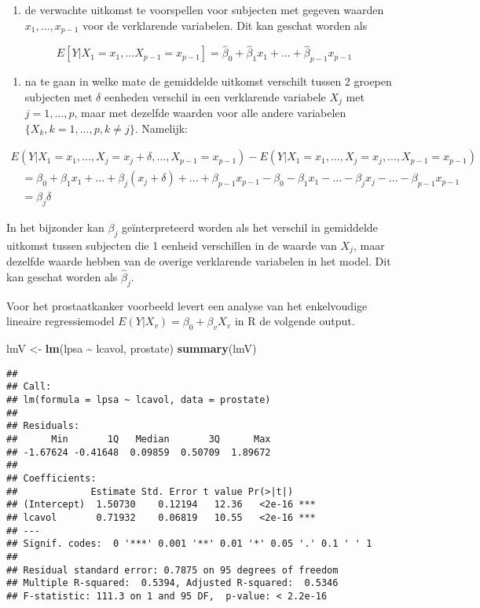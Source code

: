 \documentclass[
  12pt,dutch,coursenotes]{book}
\newenvironment{Shaded}{\begin{snugshade}}{\end{snugshade}}
\newcommand{\KeywordTok}[1]{\textcolor[rgb]{0.13,0.29,0.53}{\textbf{#1}}}
\newcommand{\NormalTok}[1]{#1}
\newcommand{\OperatorTok}[1]{\textcolor[rgb]{0.81,0.36,0.00}{\textbf{#1}}}
\newcommand{\StringTok}[1]{\textcolor[rgb]{0.31,0.60,0.02}{#1}}
\providecommand{\tightlist}{%
  \setlength{\itemsep}{0pt}\setlength{\parskip}{0pt}}
\theoremstyle{definition}
\theoremstyle{definition}
\theoremstyle{definition}
\theoremstyle{remark}
\begin{document}
\begin{enumerate}
\def\labelenumi{\arabic{enumi}.}
\tightlist
\item
  de verwachte uitkomst te voorspellen voor subjecten met gegeven
  waarden \(x_1,...,x_{p-1}\) voor de verklarende variabelen.
  Dit kan geschat worden als
\end{enumerate}

\[
E[Y\vert X_1=x_1, \ldots X_{p-1}=x_{p-1}]=\hat{\beta}_0+\hat{\beta}_1x_1+...+\hat{\beta}_{p-1}x_{p-1}
\]

\begin{enumerate}
\def\labelenumi{\arabic{enumi}.}
\setcounter{enumi}{1}
\tightlist
\item
  na te gaan in welke mate de gemiddelde uitkomst verschilt tussen 2 groepen subjecten met \(\delta\) eenheden verschil in een verklarende variabele \(X_j\) met \(j=1,\ldots,p\), maar met dezelfde waarden voor alle andere variabelen \(\{X_k,k=1,...,p,k\ne j\}\).
  Namelijk:
\end{enumerate}

\[
\begin{array}{l}
E(Y|X_1=x_1,...,X_j=x_j+\delta,...,X_{p-1}=x_{p-1}) - E(Y|X_1=x_1,...,X_j=x_j,...,X_{p-1}=x_{p-1}) \\
\quad =\beta_0 + \beta_1 x_1 + ... + \beta_j(x_j+\delta)+...+\beta_{p-1} x_{p-1} - \beta_0 - \beta_1 x_1 - ... - \beta_jx_j-...-\beta_{p-1} x_{p-1} \\
\quad= \beta_j\delta
\end{array}
\]

In het bijzonder kan \(\beta_j\) geïnterpreteerd worden als het verschil in gemiddelde uitkomst tussen subjecten die 1 eenheid verschillen in de
waarde van \(X_j\), maar dezelfde waarde hebben van de overige verklarende variabelen in het model. Dit kan geschat worden als \(\hat{\beta}_j\).

Voor het prostaatkanker voorbeeld levert een analyse van het enkelvoudige lineaire regressiemodel \(E(Y|X_v)=\beta_0+\beta_v X_v\) in R de volgende output.

\begin{Shaded}
\begin{Highlighting}[]
\NormalTok{lmV \textless{}{-}}\StringTok{ }\KeywordTok{lm}\NormalTok{(lpsa }\OperatorTok{\textasciitilde{}}\StringTok{ }\NormalTok{lcavol, prostate)}
\KeywordTok{summary}\NormalTok{(lmV)}
\end{Highlighting}
\end{Shaded}

\begin{verbatim}
## 
## Call:
## lm(formula = lpsa ~ lcavol, data = prostate)
## 
## Residuals:
##      Min       1Q   Median       3Q      Max 
## -1.67624 -0.41648  0.09859  0.50709  1.89672 
## 
## Coefficients:
##             Estimate Std. Error t value Pr(>|t|)    
## (Intercept)  1.50730    0.12194   12.36   <2e-16 ***
## lcavol       0.71932    0.06819   10.55   <2e-16 ***
## ---
## Signif. codes:  0 '***' 0.001 '**' 0.01 '*' 0.05 '.' 0.1 ' ' 1
## 
## Residual standard error: 0.7875 on 95 degrees of freedom
## Multiple R-squared:  0.5394, Adjusted R-squared:  0.5346 
## F-statistic: 111.3 on 1 and 95 DF,  p-value: < 2.2e-16
\end{verbatim}
\end{document}
